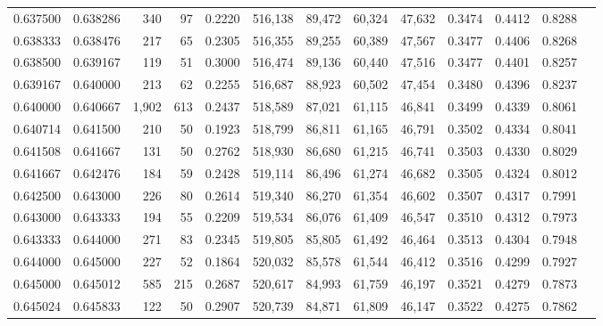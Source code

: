 \begin{tabular}{rrrrrrrrrrrrr}
0.637500 & 0.638286 &   340 &  97 &                                     0.2220 & 516,138 &  89,472 &  60,324 &  47,632 & 0.3474 & 0.4412 & 0.8288 \\
0.638333 & 0.638476 &   217 &  65 &                                     0.2305 & 516,355 &  89,255 &  60,389 &  47,567 & 0.3477 & 0.4406 & 0.8268 \\
0.638500 & 0.639167 &   119 &  51 &                                     0.3000 & 516,474 &  89,136 &  60,440 &  47,516 & 0.3477 & 0.4401 & 0.8257 \\
0.639167 & 0.640000 &   213 &  62 &                                     0.2255 & 516,687 &  88,923 &  60,502 &  47,454 & 0.3480 & 0.4396 & 0.8237 \\
0.640000 & 0.640667 & 1,902 & 613 &                                     0.2437 & 518,589 &  87,021 &  61,115 &  46,841 & 0.3499 & 0.4339 & 0.8061 \\
0.640714 & 0.641500 &   210 &  50 &                                     0.1923 & 518,799 &  86,811 &  61,165 &  46,791 & 0.3502 & 0.4334 & 0.8041 \\
0.641508 & 0.641667 &   131 &  50 &                                     0.2762 & 518,930 &  86,680 &  61,215 &  46,741 & 0.3503 & 0.4330 & 0.8029 \\
0.641667 & 0.642476 &   184 &  59 &                                     0.2428 & 519,114 &  86,496 &  61,274 &  46,682 & 0.3505 & 0.4324 & 0.8012 \\
0.642500 & 0.643000 &   226 &  80 &                                     0.2614 & 519,340 &  86,270 &  61,354 &  46,602 & 0.3507 & 0.4317 & 0.7991 \\
0.643000 & 0.643333 &   194 &  55 &                                     0.2209 & 519,534 &  86,076 &  61,409 &  46,547 & 0.3510 & 0.4312 & 0.7973 \\
0.643333 & 0.644000 &   271 &  83 &                                     0.2345 & 519,805 &  85,805 &  61,492 &  46,464 & 0.3513 & 0.4304 & 0.7948 \\
0.644000 & 0.645000 &   227 &  52 &                                     0.1864 & 520,032 &  85,578 &  61,544 &  46,412 & 0.3516 & 0.4299 & 0.7927 \\
0.645000 & 0.645012 &   585 & 215 &                                     0.2687 & 520,617 &  84,993 &  61,759 &  46,197 & 0.3521 & 0.4279 & 0.7873 \\
0.645024 & 0.645833 &   122 &  50 &                                     0.2907 & 520,739 &  84,871 &  61,809 &  46,147 & 0.3522 & 0.4275 & 0.7862 \\

\end{tabular}
